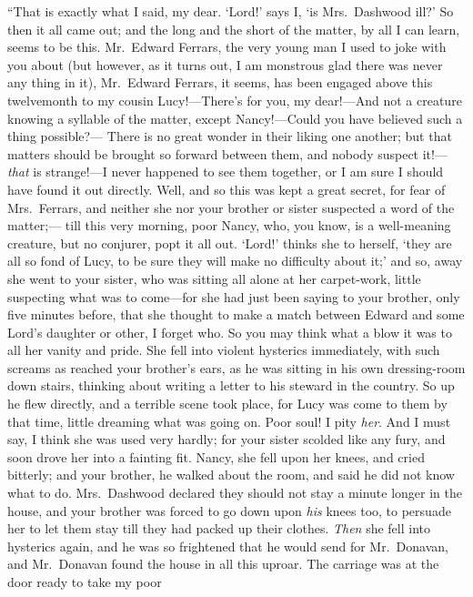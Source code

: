 \documentclass{article}
\begin{document}
``That is exactly what I said, my dear.  `Lord!' says I,
`is Mrs.\ Dashwood ill?' So then it all came out; and the
long and the short of the matter, by all I can learn,
seems to be this.  Mr.\ Edward Ferrars, the very young
man I used to joke with you about (but however, as it
turns out, I am monstrous glad there was never any thing
in it), Mr.\ Edward Ferrars, it seems, has been engaged
above this twelvemonth to my cousin Lucy!---There's for you,
my dear!---And not a creature knowing a syllable of the matter,
except Nancy!---Could you have believed such a thing possible?---%
There is no great wonder in their liking one another;
but that matters should be brought so forward between them,
and nobody suspect it!---\emph{that} is strange!---I never happened
to see them together, or I am sure I should have found it
out directly.  Well, and so this was kept a great secret,
for fear of Mrs.\ Ferrars, and neither she nor your
brother or sister suspected a word of the matter;---%
till this very morning, poor Nancy, who, you know, is a
well-meaning creature, but no conjurer, popt it all out.
`Lord!' thinks she to herself, `they are all so fond
of Lucy, to be sure they will make no difficulty about it;'
and so, away she went to your sister, who was sitting all
alone at her carpet-work, little suspecting what was to
come---for she had just been saying to your brother, only five
minutes before, that she thought to make a match between
Edward and some Lord's daughter or other, I forget who.
So you may think what a blow it was to all her vanity
and pride.  She fell into violent hysterics immediately,
with such screams as reached your brother's ears,
as he was sitting in his own dressing-room down stairs,
thinking about writing a letter to his steward in the country.
So up he flew directly, and a terrible scene took place,
for Lucy was come to them by that time, little dreaming
what was going on.  Poor soul!  I pity \emph{her}.  And I must say,
I think she was used very hardly; for your sister scolded
like any fury, and soon drove her into a fainting fit.
Nancy, she fell upon her knees, and cried bitterly;
and your brother, he walked about the room, and said
he did not know what to do.  Mrs.\ Dashwood declared
they should not stay a minute longer in the house,
and your brother was forced to go down upon \emph{his} knees too,
to persuade her to let them stay till they had packed
up their clothes.  \emph{Then} she fell into hysterics again,
and he was so frightened that he would send for Mr.\ Donavan,
and Mr.\ Donavan found the house in all this uproar.
The carriage was at the door ready to take my poor
\end{document}
